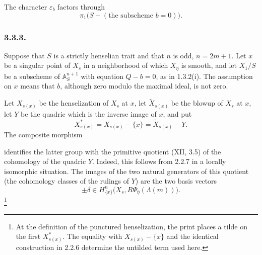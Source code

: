 The character $\varepsilon_b$ factors through
\[
\pi_1\bigl(S-(\text{the subscheme }b=0)\bigr).
\]

\subsubsection*{3.3.3.}
Suppose that $S$ is a strictly henselian trait and that $n$ is odd,
$n=2m+1$.  Let $x$ be a singular point of $X_s$ in a neighborhood
of which $X_\eta$ is smooth, and let $X_1/S$ be a subscheme of
$\mathbb A^{n+1}_S$ with equation $Q-b=0$, as in 1.3.2(i).  The
assumption on $x$ means that $b$, although zero modulo the maximal
ideal, is not zero.

Let $X_{s(x)}$ be the henselization of $X_s$ at $x$, let
$\widetilde X_{s(x)}$ be the blowup of $X_s$ at $x$, let $Y$ be the
quadric which is the inverse image of $x$, and put
\[
X^*_{s(x)}=X_{s(x)}-\{x\}=\widetilde X_{s(x)}-Y.
\]
The composite morphism
\begin{center}
\end{center}
identifies the latter group with the primitive quotient (XII, 3.5)
of the cohomology of the quadric $Y$.  Indeed, this follows from
2.2.7 in a locally isomorphic situation.  The images of the two
natural generators of this quotient (the cohomology classes of the
rulings of $Y$) are the two basis vectors
\[
\pm\delta\in
H^n_{\{x\}}\bigl(X_s,R\Psi_{\bar\eta}(\Lambda(m))\bigr).
\]
\footnote{At the definition of the punctured henselization, the print
places a tilde on the first $X^*_{s(x)}$.  The equality with
$X_{s(x)}-\{x\}$ and the identical construction in 2.2.6 determine
the untilded term used here.}
